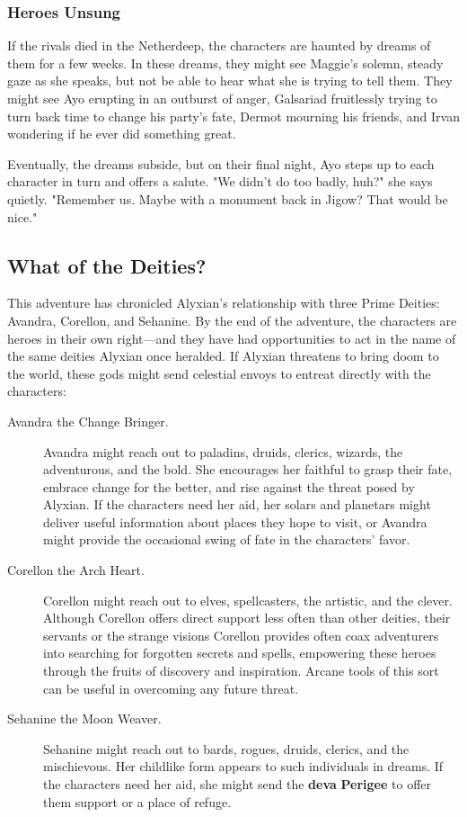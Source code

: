 \documentclass[10pt,a4paper,twoside,bg=print,twocolumn,openany,nodeprecatedcode]{dndbook}
\begin{document}
\subsubsection{Heroes Unsung}
If the rivals died in the Netherdeep, the characters are haunted by dreams of them for a few weeks. In these dreams, they might see Maggie's solemn, steady gaze as she speaks, but not be able to hear what she is trying to tell them. They might see Ayo erupting in an outburst of anger, Galsariad fruitlessly trying to turn back time to change his party's fate, Dermot mourning his friends, and Irvan wondering if he ever did something great.

Eventually, the dreams subside, but on their final night, Ayo steps up to each character in turn and offers a salute. "We didn't do too badly, huh?" she says quietly. "Remember us. Maybe with a monument back in Jigow? That would be nice."

\subsection{What of the Deities?}
This adventure has chronicled Alyxian's relationship with three Prime Deities: Avandra, Corellon, and Sehanine. By the end of the adventure, the characters are heroes in their own right—and they have had opportunities to act in the name of the same deities Alyxian once heralded. If Alyxian threatens to bring doom to the world, these gods might send celestial envoys to entreat directly with the characters:


\begin{description}
\item[Avandra the Change Bringer.]
Avandra might reach out to paladins, druids, clerics, wizards, the adventurous, and the bold. She encourages her faithful to grasp their fate, embrace change for the better, and rise against the threat posed by Alyxian. If the characters need her aid, her solars and planetars might deliver useful information about places they hope to visit, or Avandra might provide the occasional swing of fate in the characters' favor.
\item[Corellon the Arch Heart.]
Corellon might reach out to elves, spellcasters, the artistic, and the clever. Although Corellon offers direct support less often than other deities, their servants or the strange visions Corellon provides often coax adventurers into searching for forgotten secrets and spells, empowering these heroes through the fruits of discovery and inspiration. Arcane tools of this sort can be useful in overcoming any future threat.
\item[Sehanine the Moon Weaver.]
Sehanine might reach out to bards, rogues, druids, clerics, and the mischievous. Her childlike form appears to such individuals in dreams. If the characters need her aid, she might send the \textbf{deva} \textbf{Perigee} to offer them support or a place of refuge.
\end{description}
\end{document}
